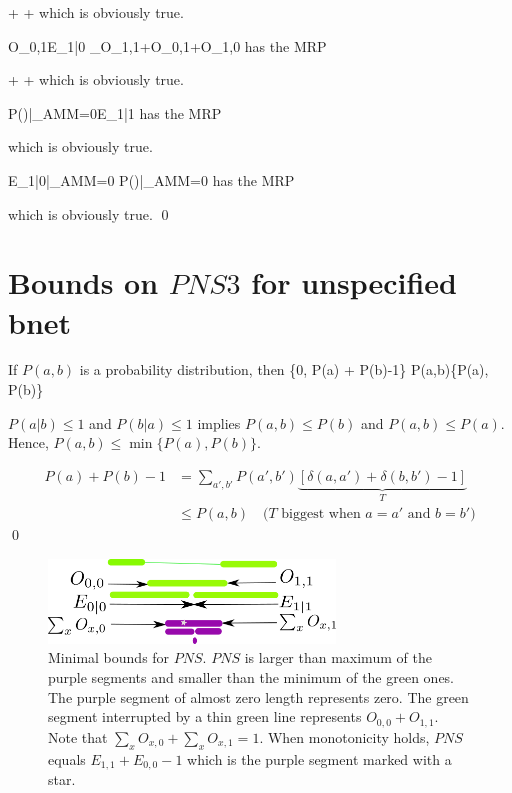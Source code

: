\beq
{}
\leq
{}
\leq
{}
+
+
\eeq
which is obviously true.

\beq
O_{0,1}\leq E_{1|0} \leq 
{}
_{O_{1,1}+O_{0,1}+O_{1,0}}
\eeq
has the MRP

\beq
{}
\leq
{}
\leq
{}
+
+
\eeq
which is obviously true.

\beq
P()|_{AMM=0}\leq E_{1|1}
\eeq
has the MRP 

\beq
{}
\leq
{}
\eeq
which is obviously true.

\beq
E_{1|0}|_{AMM=0}\leq
P()|_{AMM=0}
\eeq
has the MRP

\beq
{}
\leq
{}
\eeq
which is obviously true.
\qed



\section{Bounds on $PNS3$ for unspecified bnet}

\begin{claim}\label{cl-basic-bound-joint}
If $P(a,b)$ is a probability 
distribution, then
\beq
\max\{0, P(a) + P(b)-1\}\leq 
P(a,b)\leq \min\{P(a), P(b)\}
\eeq
\end{claim}
\proof
$P(a|b)\leq 1$ 
and $P(b|a)\leq 1$
implies $P(a,b)\leq P(b)$
and $P(a,b)\leq P(a)$.
Hence, $P(a,b)\leq \min\{P(a), P(b)\}$.

\begin{align}
P(a) + P(b) -1
&=
\sum_{a', b'} P(a',b')
\underbrace
{[\delta(a,a')+\delta(b,b')
-1]}_{T}
\\
&\leq
P(a,b)\quad 
\text{($T$ biggest
when $a=a'$ and $b=b'$)}
\end{align}
\qed


\begin{figure}[h!]
\centering
\includegraphics[width=3in]
{personalized/bounds-minimal.png}
\caption{Minimal bounds
for $PNS$.
$PNS$ is larger
than maximum of the purple segments
and smaller than the
minimum of the green ones.
The purple segment of almost zero
length represents zero.
The green segment 
interrupted by a thin green
line represents $O_{0,0} + O_{1,1}$.
Note that $\sum_x O_{x,0}+ 
\sum_x O_{x,1}=1$. When
monotonicity holds,
$PNS$ equals $E_{1,1}+E_{0,0}-1$
which is the purple
segment marked with a star.
} 
\label{fig-bounds-minimal}
\end{figure}

